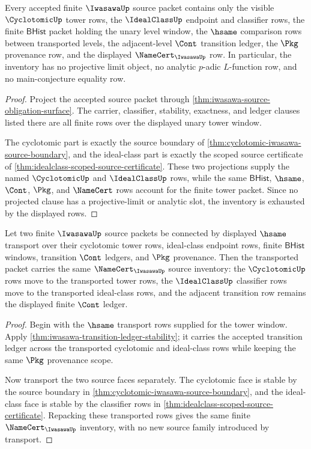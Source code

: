 \begin{theorem}
\label{thm:iwasawa-finite-source-inventory}
Every accepted finite $\IwasawaUp$ source packet contains only the visible
$\CyclotomicUp$ tower rows, the $\IdealClassUp$ endpoint and classifier rows,
the finite $\mathsf{BHist}$ packet holding the unary level window, the
$\hsame$ comparison rows between transported levels, the adjacent-level
$\Cont$ transition ledger, the $\Pkg$ provenance row, and the displayed
$\NameCert_{\IwasawaUp}$ row. In particular, the inventory has no projective
limit object, no analytic $p$-adic $L$-function row, and no main-conjecture
equality row.
\end{theorem}
\begin{proof}
Project the accepted source packet through
\autoref{thm:iwasawa-source-obligation-surface}. The carrier, classifier,
stability, exactness, and ledger clauses listed there are all finite rows over
the displayed unary tower window.

The cyclotomic part is exactly the source boundary of
\autoref{thm:cyclotomic-iwasawa-source-boundary}, and the ideal-class part is
exactly the scoped source certificate of
\autoref{thm:idealclass-scoped-source-certificate}. These two projections
supply the named $\CyclotomicUp$ and $\IdealClassUp$ rows, while the same
$\mathsf{BHist}$, $\hsame$, $\Cont$, $\Pkg$, and $\NameCert$ rows account for
the finite tower packet. Since no projected clause has a projective-limit or
analytic slot, the inventory is exhausted by the displayed rows.
\end{proof}

\begin{theorem}
\label{thm:iwasawa-classifier-transport-surface}
Let two finite $\IwasawaUp$ source packets be connected by displayed $\hsame$
transport over their cyclotomic tower rows, ideal-class endpoint rows, finite
$\mathsf{BHist}$ windows, transition $\Cont$ ledgers, and $\Pkg$ provenance.
Then the transported packet carries the same $\NameCert_{\IwasawaUp}$ source
inventory: the $\CyclotomicUp$ rows move to the transported tower rows, the
$\IdealClassUp$ classifier rows move to the transported ideal-class rows, and
the adjacent transition row remains the displayed finite $\Cont$ ledger.
\end{theorem}
\begin{proof}
Begin with the $\hsame$ transport rows supplied for the tower window. Apply
\autoref{thm:iwasawa-transition-ledger-stability}; it carries the accepted
transition ledger across the transported cyclotomic and ideal-class rows while
keeping the same $\Pkg$ provenance scope.

Now transport the two source faces separately. The cyclotomic face is stable by
the source boundary in
\autoref{thm:cyclotomic-iwasawa-source-boundary}, and the ideal-class face is
stable by the classifier rows in
\autoref{thm:idealclass-scoped-source-certificate}. Repacking these transported
rows gives the same finite $\NameCert_{\IwasawaUp}$ inventory, with no new
source family introduced by transport.
\end{proof}

